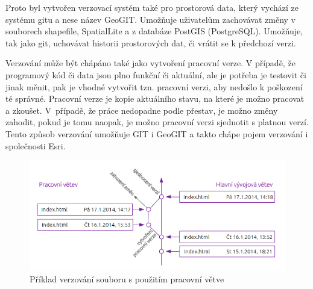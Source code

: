         Proto byl vytvořen verzovací systém také pro prostorová data, který vychází ze
        systému gitu a nese název GeoGIT. Umožňuje uživatelům zachovávat změny v
        souborech shapefile, SpatialLite a z databáze PostGIS (PostgreSQL). Umožňuje,
        tak jako git, uchovávat historii prostorových dat, či vrátit se k předchozí
        verzi. 

        Verzování může být chápáno také jako vytvoření pracovní verze. V případě, že
        programový kód či data jsou plno funkční či aktuální, ale je potřeba je
        testovit či jinak měnit, pak je vhodné vytvořit tzn. pracovní verzi, aby
        nedošlo k poškození té správné. Pracovní verze je kopie aktuálního stavu, na
        které je možno pracovat a zkoušet. V~případě, že práce nedopadne podle přestav,
        je možno změny zahodit, pokud je tomu naopak, je možno pracovní verzi sjednotit
        s platnou verzí. Tento způsob verzování umožňuje GIT i GeoGIT a takto chápe
        pojem verzování i společnosti Esri.

          \begin{figure}[H]
            \centering
            \includegraphics[scale=1]{../../../grafy/obr/schema_verzovani_branch_maxiTence.png}
            \caption {Příklad verzování souboru s použitím pracovní větve}
          \end{figure}

        

